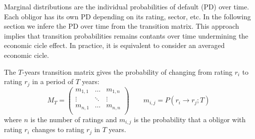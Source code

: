 \documentclass[11pt,fleqn]{book} %
\begin{document}
Marginal distributions are the individual probabilities of default 
(PD) over time. Each obligor has its own PD depending on its rating,
sector, etc. In the following section we infere the PD over time from 
the transition matrix. This approach implies that transition 
probabilities remains contants over time undermining the economic 
cicle effect. In practice, it is equivalent to consider an averaged 
economic cicle.

\begin{definition} 
	The $T$-years transition matrix gives the probability of changing 
	from rating $r_i$ to rating $r_j$ in a period of $T$ years:
	\begin{displaymath}
		M_T = \left(
		\begin{array}{ccc}
			m_{1,1} & \dots  & m_{1,n} \\
			\vdots  & \ddots & \vdots  \\
			m_{n,1} & \dots  & m_{n,n} \\
		\end{array}
		\right)
		\qquad
		m_{i,j} = P(r_i \to r_j;T)
	\end{displaymath}
	where $n$ is the number of ratings and $m_{i,j}$ is the probability that a
	obligor with rating $r_i$ changes to rating $r_j$ in $T$ years.
\end{definition}
\end{document}
